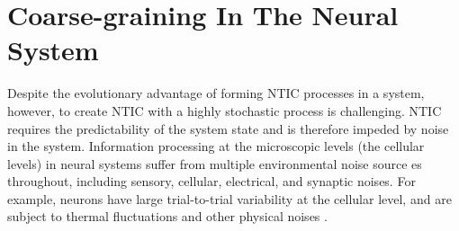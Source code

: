 \documentclass[utf8]{article}
\begin{document}
            
            


	\section{Coarse-graining In The Neural System} \label{sec:Neural coarse-graining}

		Despite the evolutionary advantage of forming NTIC processes in a system, however, to create NTIC with a highly stochastic process is challenging. NTIC requires the predictability of the system state and is therefore impeded by noise in the system. Information processing at the microscopic levels (the cellular levels) in neural systems suffer from multiple environmental noise source es throughout, including sensory, cellular, electrical, and synaptic noises. For example, neurons have large trial-to-trial variability at the cellular level, and are subject to thermal fluctuations and other physical noises \citep{faisal2008noise}. 
		
\end{document}
